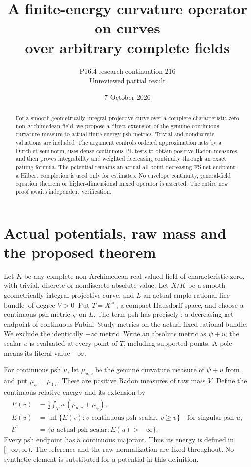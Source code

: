 \documentclass[11pt]{article}
\title{A finite-energy curvature operator on curves\\over arbitrary complete fields}
\author{P16.4 research continuation 216\\Unreviewed partial result}
\date{7 October 2026}
\newcommand{\an}{\mathrm{an}}
\newcommand{\E}{\mathcal E}
\begin{document}
\maketitle
\begin{abstract}
For a smooth geometrically integral projective curve over a complete
characteristic-zero non-Archimedean field, we propose a direct extension
of the genuine continuous curvature measure to actual finite-energy
psh metrics. Trivial and nondiscrete valuations are included. The
argument controls ordered approximation nets by a Dirichlet seminorm,
uses dense continuous PL tests to obtain positive Radon measures, and
then proves integrability and weighted decreasing continuity through
an exact pairing formula. The potential remains an actual all-point
decreasing-FS-net endpoint; a Hilbert completion is used only for
estimates. No envelope continuity, general-field equation theorem or
higher-dimensional mixed operator is asserted. The entire new proof
awaits independent verification.
\end{abstract}

\section{Actual potentials, raw mass and the proposed theorem}

Let $K$ be any complete non-Archimedean real-valued field of
characteristic zero, with trivial, discrete or nondiscrete absolute
value. Let $X/K$ be a smooth geometrically integral projective curve,
and $L$ an actual ample rational line bundle, of degree $V>0$.
Put $T=X^{\an}$, a compact Hausdorff space, and choose a continuous
psh metric $\psi$ on $L$. The term psh has precisely
\cite[Definition 7.2]{BE}: a decreasing-net endpoint of continuous
Fubini--Study metrics on the actual fixed rational bundle. We exclude
the identically $-\infty$ metric. Write an absolute metric as $\psi+u$;
the scalar $u$ is evaluated at every point of $T$, including supported
points. A pole means its literal value $-\infty$.

For continuous psh $u$, let $\mu_{u,c}$ be the genuine curvature
measure of $\psi+u$ from \cite[Theorem 8.4]{BE}, and put
$\mu_\psi=\mu_{0,c}$. These are positive Radon measures of raw mass
$V$. Define the continuous relative energy and its extension by
\begin{equation}\label{eq:def}
 \begin{aligned}
 E(u)&=\frac12\int_Tu\,(\mu_{u,c}+\mu_\psi),\\
 E(u)&=\inf\{E(v):v\text{ continuous psh scalar},\ v\geq u\}
                \quad\text{for singular psh }u,\\
 \E^1&=\{u\text{ actual psh scalar}:E(u)>-\infty\}.
 \end{aligned}
\end{equation}
Every psh endpoint has a continuous majorant. Thus its energy is
defined in $[-\infty,\infty)$. The reference and the raw normalization
are fixed throughout. No synthetic element is substituted for a
potential in this definition.
\end{document}
